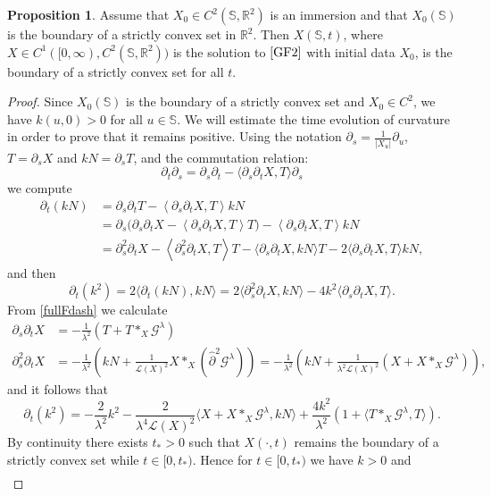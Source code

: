 \documentclass[a4paper,11pt]{amsart}
\theoremstyle{definition}\newtheorem*{definition}{Definition}
\theoremstyle{definition} \newtheorem{proposition}[theorem]{Proposition}
\theoremstyle{definition}\newtheorem{lemma}[theorem]{Lemma}
\theoremstyle{definition}\newtheorem{corollary}[theorem]{Corollary}
\theoremstyle{definition}\newtheorem{example}{Example}
\theoremstyle{remark}\newtheorem*{remark}{Remark}
\def\phat{\hat{\partial} }
\def\R{\mathbb{R}}
\def\S{\mathbb{S}}
\newcommand{\ip}[1]{{\left \langle {#1} \right \rangle}}
\newcommand{\abs}[1]{\left | {#1}\right |}
\def\length{\mathcal L}
\begin{document}
\begin{proposition}
Assume that $X_0\in C^2(\S,\R^2)$ is an immersion and that $X_0(\S)$ is the boundary of a strictly convex set in $\R^2$.
Then $X(\S,t)$, where $X\in C^1([0,\infty),C^2(\S,\R^2))$ is the solution to $\eqref{GF2}$ with initial data $X_0$, is the boundary of a strictly convex set for all $t$. 
\end{proposition}
\begin{proof} 
Since $X_0(\S)$ is the boundary of a strictly convex set and $X_0\in C^2$, we have $k(u,0)>0$ for all $u\in \S$. We will estimate the time evolution of curvature in order to prove that it remains positive. Using the notation $\partial_s=\frac{1}{\abs{X_u}}\partial_u$, $T=\partial_s X$ and $kN=\partial_s T$, and the commutation relation:
\[
\partial_t\partial_s = \partial_s\partial_t -\langle \partial_s \partial_tX,T \rangle \partial_s
\]
we compute 
\begin{align*}
\partial_t (kN) &=\partial_s \partial_t T-\ip{\partial_s\partial_t X,T} kN\\
&= \partial_s \big ( \partial_s \partial_t X-\ip{\partial_s \partial_t X,T }T\big )-\ip{\partial_s\partial_t X,T} kN\\
&=\partial_s^2 \partial_t X
-\ip {\partial_s^2\partial_t X,T} T
-\langle \partial_s \partial_tX,kN\rangle T
-2\langle \partial_s \partial_t X,T \rangle kN,
\end{align*}
and then 
\[
\partial_t (k^2)=2\langle \partial_t(kN),kN\rangle=2\langle \partial_s^2\partial_t X,kN\rangle - 4k^2\langle \partial_s \partial_t X,T\rangle .
\]
From \eqref{fullFdash} we calculate 
\begin{align*}
    \partial_s \partial_t X & =-\frac{1}{\lambda^2}\left (T+T\ast_X\mathcal G^\lambda\right)\\
    \partial_s^2 \partial_tX&=-\frac{1}{\lambda^2}\left (kN+\frac{1}{\length(X)^2}X\ast_X(\phat^2 \mathcal G^\lambda) \right)=-\frac{1}{\lambda^2}\left (kN+\frac{1}{\lambda^2\length(X)^2}\left (X+X\ast_X\mathcal G^\lambda \right)\right),
\end{align*}
and it follows that 
\[
\partial_t(k^2)=-\frac{2}{\lambda^2}k^2-\frac{2}{\lambda^4\length(X)^2}\langle X+X\ast_X\mathcal G^\lambda,kN\rangle +\frac{4k^2}{\lambda^2}\left (1+\langle T\ast_X\mathcal G^\lambda ,T\rangle \right).
\]
By continuity there exists $t_*>0$ such that $X(\cdot,t)$ remains the boundary of a strictly convex set while $t\in [0,t_*)$. Hence for $t\in [0,t_*)$
we have $k>0$ and
\begin{align}\label{curvatureevo}

\end{align}
\end{proof}
\end{document}
